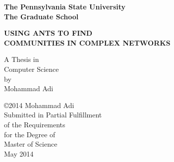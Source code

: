\thispagestyle{empty}
\begin{titlepage}
\begin{center}
\begin{spacing}{1.5}
\textbf{\large The Pennsylvania State University} \\
\textbf{\large The Graduate School} 
\end{spacing}

\vspace{15 mm}

\begin{spacing}{2.5}
\textbf{\LARGE USING ANTS TO FIND} \\ 
\textbf{\LARGE COMMUNITIES IN COMPLEX NETWORKS} \\[15mm]
\end{spacing}

\large A Thesis in \\
\large Computer Science \\
\large by\\
\large Mohammad Adi \\

\vspace{15mm}

\large \copyright 2014 Mohammad Adi \\[15mm]

\large Submitted in Partial Fulfillment \\
\large of the Requirements \\
\large for the Degree of \\[20 mm]

\large Master of Science \\[20mm]

\large May 2014
\end{center}

\end{titlepage}